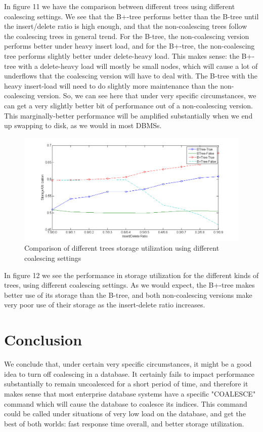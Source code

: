 \documentclass[fleqn]{article}
\begin{document}
In figure 11 we have the comparison between different trees using different coalescing settings.  We see that the B+-tree performs better than the B-tree until the insert/delete ratio is high enough, and that the non-coalescing trees follow the coalescing trees in general trend.  For the B-tree, the non-coalescing version performs better under heavy insert load, and for the B+-tree, the non-coalescing tree performs slightly better under delete-heavy load.  This makes sense: the B+-tree with a delete-heavy load will mostly be small nodes, which will cause a lot of underflows that the coalescing version will have to deal with.  The B-tree with the heavy insert-load will need to do slightly more maintenance than the non-coalescing version.  So, we can see here that under very specific circumstances, we can get a very slightly better bit of performance out of a non-coalescing version.  This marginally-better performance will be amplified substantially when we end up swapping to disk, as we would in most DBMSs.\\

\begin{figure}[h!]
\centerline{\includegraphics[width=1.2\linewidth]{Images/figure4.png}}
\caption{Comparison of different trees storage utilization using different coalescing settings}
\end{figure}

In figure 12 we see the performance in storage utilization for the different kinds of trees, using different coalescing settings.  As we would expect, the B+-tree makes better use of its storage than the B-tree, and both non-coalescing versions make very poor use of their storage as the insert-delete ratio increases.\\

\clearpage

\section{Conclusion}

We conclude that, under certain very specific circumstances, it might be a good idea to turn off coalescing in a database.  It certainly fails to impact performance substantially to remain uncoalesced for a short period of time, and therefore it makes sense that most enterprise database systems have a specific "COALESCE" command which will cause the database to coalesce its indices.  This command could be called under situations of very low load on the database, and get the best of both worlds: fast response time overall, and better storage utilization.
\end{document}
